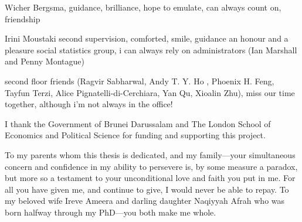 \documentclass[11pt,twoside,openright,showframe]{report}
\begin{document}
Wicher Bergsma, guidance, brilliance, hope to emulate, can always count on, friendship

Irini Moustaki second supervision, comforted, smile, guidance 
an honour and a pleasure social statistics group, 
i can always rely on administrators (Ian Marshall and Penny Montague) 

second floor friends (Ragvir Sabharwal, Andy T. Y. Ho , Phoenix H. Feng, Tayfun Terzi, Alice Pignatelli-di-Cerchiara, Yan Qu, Xioalin Zhu), miss our time together, although i'm not always in the office!

I thank the Government of Brunei Darussalam and The London School of Economics and Political Science for funding and supporting this project.

To my parents whom this thesis is dedicated, and my family---your simultaneous concern and confidence in my ability to persevere is, by some measure a paradox, but more so a testament to your unconditional love and faith you put in me.
For all you have given me, and continue to give, I would never be able to repay.
To my beloved wife Ireve Ameera and darling daughter Naqiyyah Afrah who was born halfway through my PhD---you both make me whole.
 





\end{document}
